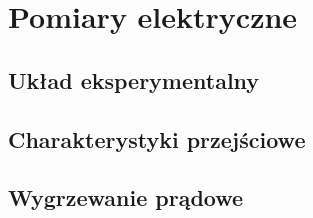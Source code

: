 \chapter{Pomiary elektryczne}
\lipsum
\section{Układ eksperymentalny}

\section{Charakterystyki przejściowe}

\section{Wygrzewanie prądowe}
\lipsum

